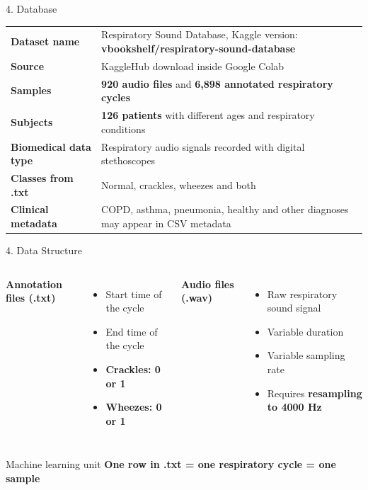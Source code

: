 \documentclass[aspectratio=169]{beamer}
\newcommand{\important}[1]{\textcolor{YachayBlue}{\textbf{#1}}}
\begin{document}
\begin{frame}{4. Database}
\small
\renewcommand{\arraystretch}{1.3}
\begin{tabularx}{\textwidth}{>{\bfseries}p{3.0cm} X}
\toprule
Dataset name & Respiratory Sound Database, Kaggle version: \important{vbookshelf/respiratory-sound-database} \\
Source & KaggleHub download inside Google Colab \\
Samples & \important{920 audio files} and \important{6,898 annotated respiratory cycles} \\
Subjects & \important{126 patients} with different ages and respiratory conditions \\
Biomedical data type & Respiratory audio signals recorded with digital stethoscopes \\
Classes from .txt & Normal, crackles, wheezes and both \\
Clinical metadata & COPD, asthma, pneumonia, healthy and other diagnoses may appear in CSV metadata \\
\bottomrule
\end{tabularx}
\end{frame}

\begin{frame}{4. Data Structure}
\small
\begin{columns}[T]
\textbf{Annotation files (.txt)}
\begin{itemize}
    \item Start time of the cycle
    \item End time of the cycle
    \item \important{Crackles: 0 or 1}
    \item \important{Wheezes: 0 or 1}
\end{itemize}

\textbf{Audio files (.wav)}
\begin{itemize}
    \item Raw respiratory sound signal
    \item Variable duration
    \item Variable sampling rate
    \item Requires \important{resampling to 4000 Hz}
\end{itemize}
\end{columns}

\vspace{0.35cm}
\begin{block}{Machine learning unit}
\centering
\important{One row in .txt = one respiratory cycle = one sample}
\end{block}
\end{frame}
\end{document}
